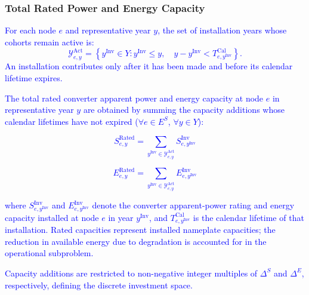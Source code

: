 \documentclass[preprint,12pt]{elsarticle}
\begin{document}
\subsubsection{Total Rated Power and Energy Capacity}

\textcolor{blue}{
    For each node $e$ and representative year $y$, the set of
    installation years whose cohorts remain active is:
    \begin{equation}
        \mathcal{Y}^{\text{Act}}_{e,y}
        =
        \left\{
            y^{\text{Inv}}\in Y :
            y^{\text{Inv}}\le y,\quad
            y-y^{\text{Inv}}<
            T^{\text{Cal}}_{e,y^{\text{Inv}}}
        \right\}.
        \label{eq:active_cohorts}
    \end{equation}
    An installation contributes only after it has been made
    and before its calendar lifetime expires.
}

\textcolor{blue}{
    The total rated converter apparent power and energy capacity at node $e$ in representative year $y$ are obtained by summing the capacity additions whose calendar lifetimes have not expired ($\forall e\in E^S$, $\forall y\in Y$):
}

\textcolor{blue}{
    \begin{equation}
        S^{\text{Rated}}_{e,y}
        =
        \sum_{y^{\text{Inv}}\in\mathcal{Y}^{\text{Act}}_{e,y}}
        S^{\text{Inv}}_{e,y^{\text{Inv}}}
        \label{eq:master_rated_s}
    \end{equation}
}

\textcolor{blue}{
    \begin{equation}
        E^{\text{Rated}}_{e,y}
        =
        \sum_{y^{\text{Inv}}\in\mathcal{Y}^{\text{Act}}_{e,y}}
        E^{\text{Inv}}_{e,y^{\text{Inv}}}
    \end{equation}
}

\noindent
\textcolor{blue}{
    where 
    $S^{\text{Inv}}_{e,y^{\text{Inv}}}$ and $E^{\text{Inv}}_{e,y^{\text{Inv}}}$ denote the converter apparent-power rating and energy capacity installed at node $e$ in year $y^{\text{Inv}}$, and
    $T^{\text{Cal}}_{e,y^{\text{Inv}}}$ is the calendar lifetime of that installation. 
    Rated capacities represent installed nameplate capacities; the reduction in available energy due to degradation is accounted for in the operational subproblem.
}

\textcolor{blue}{
    Capacity additions are restricted to non-negative integer multiples of $\Delta^S$ and $\Delta^E$, respectively, defining the discrete investment space.
}
\end{document}
